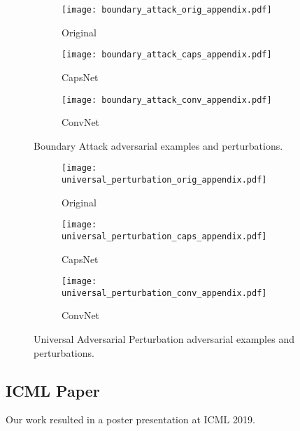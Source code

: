 \begin{figure}
	\centering
	
	\begin{subfigure}{.23\textwidth}
		\centering
		\texttt{[image: boundary\_attack\_orig\_appendix.pdf]}%
		\caption{Original}%
	\end{subfigure}%
	\begin{subfigure}{.36\textwidth}
		\centering
		\texttt{[image: boundary\_attack\_caps\_appendix.pdf]}%
		\caption{CapsNet}
	\end{subfigure}%
	\begin{subfigure}{.36\textwidth}
		\centering
		\texttt{[image: boundary\_attack\_conv\_appendix.pdf]}%
		\caption{ConvNet}
	\end{subfigure}
	\caption[Boundary Attack Adversarial Examples]{Boundary Attack adversarial examples and perturbations.}
	\label{fig:boundary-img}
	
\end{figure}

\begin{figure}
	\centering
	
	\begin{subfigure}{.23\textwidth}
		\centering
		\texttt{[image: universal\_perturbation\_orig\_appendix.pdf]}%
		\caption{Original}%
	\end{subfigure}%
	\begin{subfigure}{.36\textwidth}
		\centering
		\texttt{[image: universal\_perturbation\_caps\_appendix.pdf]}%
		\caption{CapsNet}
	\end{subfigure}%
	\begin{subfigure}{.36\textwidth}
		\centering
		\texttt{[image: universal\_perturbation\_conv\_appendix.pdf]}%
		\caption{ConvNet}
	\end{subfigure}
	\caption[Universal Adversarial Perturbation Adversarial Examples]{Universal Adversarial Perturbation adversarial examples and perturbations.}
	\label{fig:universal-img}
	
\end{figure}

\subsection{ICML Paper}

Our work resulted in a poster presentation at ICML 2019.

